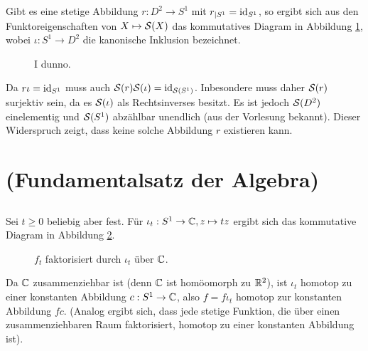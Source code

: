 \documentclass[a4paper,10pt]{article}
\begin{document}
Gibt es eine stetige Abbildung $r : D^2 \to S^1$ mit $r_{|S^1} = \operatorname{id}_{S^1}$, so ergibt sich aus den Funktoreigenschaften von $X \mapsto \mathcal{S}(X)$ das kommutatives Diagram in Abbildung \ref{fig: SX Funktor}, wobei $\iota : S^1 \to D^2$ die kanonische Inklusion bezeichnet.
\begin{figure}\centering
 \caption{I dunno.}
 \label{fig: SX Funktor}
\end{figure}

Da $r \iota = \operatorname{id}_{S^1}$ muss auch $\mathcal{S}(r) \mathcal{S}(\iota) = \operatorname{id}_{\mathcal{S}\left(S^1\right)}$. Inbesondere muss daher $\mathcal{S}(r)$ surjektiv sein, da es $\mathcal{S}(\iota)$ als Rechtsinverses besitzt. Es ist jedoch $\mathcal{S}(D^2)$ einelementig und $\mathcal{S}(S^1)$ abzählbar unendlich (aus der Vorlesung bekannt). Dieser Widerspruch zeigt, dass keine solche Abbildung $r$ existieren kann.





\section{(Fundamentalsatz der Algebra)}


\subsection{}
Sei $t \geq 0$ beliebig aber fest. Für $\iota_t : S^1 \to \mathbb{C}, z \mapsto tz$ ergibt sich das kommutative Diagram in Abbildung \ref{fig: f_t faktorisiert}.
\begin{figure}[b]\centering
 \caption{$f_t$ faktorisiert durch $\iota_t$ über $\mathbb{C}$.}
 \label{fig: f_t faktorisiert}
\end{figure}
Da $\mathbb{C}$ zusammenziehbar ist (denn $\mathbb{C}$ ist homöomorph zu $\mathbb{R}^2$), ist $\iota_t$ homotop zu einer konstanten Abbildung $c : S^1 \to \mathbb{C}$, also $f = f \iota_t$ homotop zur konstanten Abbildung $f c$. (Analog ergibt sich, dass jede stetige Funktion, die über einen zusammenziehbaren Raum faktorisiert, homotop zu einer konstanten Abbildung ist).
\end{document}
